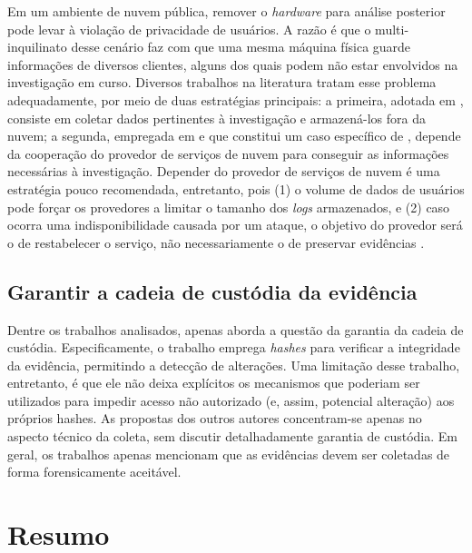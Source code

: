 Em um ambiente de nuvem pública, remover o \textit{hardware} para análise posterior pode levar à violação de privacidade de usuários.
%
A razão é que o multi-inquilinato desse cenário faz com que uma mesma máquina física guarde informações de diversos clientes, alguns dos quais podem não estar envolvidos na investigação em curso.
%
Diversos trabalhos na literatura tratam esse problema adequadamente, por meio de duas estratégias principais: a primeira, adotada em \cite{ReichertAutoAcquisition:2015,GeorgeDF2CE:2012,PoiselVMI:2013,DykstraFROST:2013,FaaSIndexedSearch:2012}, consiste em coletar dados pertinentes à investigação e armazená-los fora da nuvem; a segunda, empregada em \cite{SangLogApproach:2013} e que constitui um caso específico de \cite{GeorgeDF2CE:2012}, depende da cooperação do provedor de serviços de nuvem para conseguir as informações necessárias à investigação. 
%
Depender do provedor de serviços de nuvem é uma estratégia pouco recomendada, entretanto, pois (1) o volume de dados de usuários pode forçar os provedores a limitar o tamanho dos \textit{logs} armazenados, e (2) caso ocorra uma indisponibilidade causada por um ataque, o objetivo do provedor será o de restabelecer o serviço, não necessariamente o de preservar evidências \cite{ClarkeReviewOfChallenges2015}. 


\subsection{Garantir a cadeia de custódia da evidência}
\label{sec:cadeiadecustodia}

Dentre os trabalhos analisados, apenas \cite{SangLogApproach:2013} aborda a questão da garantia da cadeia de custódia. 
%
Especificamente, o trabalho emprega \textit{hashes} para verificar a integridade da evidência, permitindo a detecção de alterações.
%
Uma limitação desse trabalho, entretanto, é que ele não deixa explícitos os mecanismos que poderiam ser utilizados para impedir acesso não autorizado (e, assim, potencial alteração) aos próprios hashes. 
%
As propostas dos outros autores concentram-se apenas no aspecto técnico da coleta, sem discutir detalhadamente garantia de custódia.
%
Em geral, os trabalhos apenas mencionam que as evidências devem ser coletadas de forma forensicamente aceitável.

\section{Resumo}
\label{sec:resumo}

